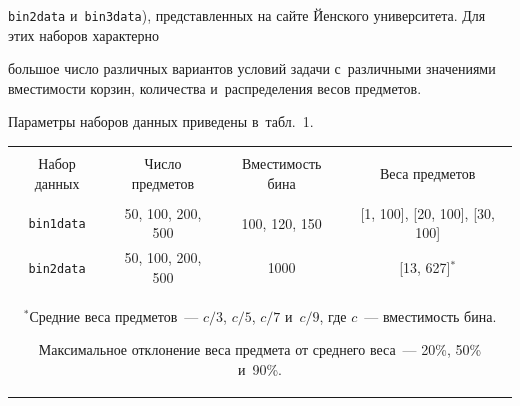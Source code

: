     \texttt{bin2data} и~\texttt{bin3data}), пред\-став\-лен\-ных на сайте Йенского университета. Для этих наборов характерно 

    большое чис\-ло различных вариантов условий задачи с~различными значениями  вмес\-ти\-мости корзин,  количества и~распределения весов предметов.



    Параметры наборов данных приведены в~табл.~1.

    

    

    

    

     \begin{table}[h]\small %

\vspace*{-6pt}

\begin{center}


    \label{tab:dataset1}

\vspace*{2ex}



    \tabcolsep=5.2pt

    \begin{tabular}{|c|c|c|c|}

    \hline

           &&&\\[-10pt]

       \multicolumn{1}{|c|}{Набор данных}  &Число предметов &  Вместимость бина &Веса предметов\\

       \hline

              &&&\\[-10pt]

       \texttt{bin1data} & 50, 100, 200, 500 &  100, 120, 150 &[1, 100], [20, 100], [30, 100]\\

       \texttt{bin2data} &50, 100, 200, 500 & 1000 &[13, 627]$^*$\\

     \hline

          \multicolumn{4}{p{127mm}}{\hspace*{2mm}$^*$Средние веса предметов~--- $c/3$, $c/5$, $c/7$ и~$c/9$, где $c$~--- вмес\-ти\-мость бина. 

 Максимальное отклонение веса пред\-ме\-та от сред\-не\-го веса~--- 20\%, 50\% и~90\%.}

 \end{tabular}

\end{center}

\vspace*{-18pt}

\end{table}







